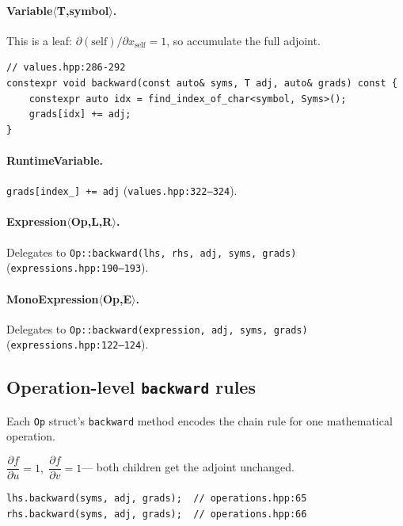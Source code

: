 \documentclass[11pt,a4paper]{article}
\newcommand{\code}[1]{\texttt{#1}}
\newcommand{\pf}[2]{\dfrac{\partial #1}{\partial #2}}
\begin{document}
\paragraph{Variable$\langle$T,symbol$\rangle$.}
This is a leaf: $\partial(\text{self})/\partial x_{\text{self}} = 1$,
so accumulate the full adjoint.
\begin{lstlisting}
// values.hpp:286-292
constexpr void backward(const auto& syms, T adj, auto& grads) const {
    constexpr auto idx = find_index_of_char<symbol, Syms>();
    grads[idx] += adj;
}
\end{lstlisting}

\paragraph{RuntimeVariable.}
\code{grads[index\_] += adj} (\texttt{values.hpp:322--324}).

\paragraph{Expression$\langle$Op,L,R$\rangle$.}
Delegates to \code{Op::backward(lhs, rhs, adj, syms, grads)}
(\texttt{expressions.hpp:190--193}).

\paragraph{MonoExpression$\langle$Op,E$\rangle$.}
Delegates to \code{Op::backward(expression, adj, syms, grads)}
(\texttt{expressions.hpp:122--124}).

\subsection{Operation-level \texttt{backward} rules}
\label{sec:opbackward}

Each \code{Op} struct's \code{backward} method encodes the chain rule for one
mathematical operation.

\begin{tcolorbox}[defbox={{SumOp: $f = u + v$}}]
$\pf{f}{u} = 1,\;\pf{f}{v} = 1$\;--- both children get the adjoint unchanged.
\begin{lstlisting}
lhs.backward(syms, adj, grads);  // operations.hpp:65
rhs.backward(syms, adj, grads);  // operations.hpp:66
\end{lstlisting}
\end{tcolorbox}
\end{document}
